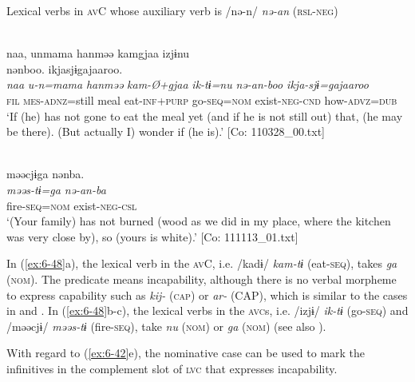   Lexical verbs in \textsc{av}C whose auxiliary verb is /nə-n/ \textit{nə-an} (\textsc{rsl}-\textsc{neg})

\ex{}\\
{\TM}
\glll  naa,  unmama  hanməə  kamgjaa  izjɨnu\\                                                                                        nənboo.  ikjasjɨgajaaroo.\\
      \textit{naa}  \textit{u-n=mama}  \textit{hanməə}  \textit{kam-Ø+gjaa}  \textit{ik-tɨ=nu}                                        \textit{nə-an-boo  ikja-sjɨ=gajaaroo}\\
      \textsc{fil}  \textsc{mes}-\textsc{adnz}=still  meal  eat-\textsc{inf}+\textsc{purp}  go-\textsc{seq}=\textsc{nom}              exist-\textsc{neg}-\textsc{cnd}  how-\textsc{advz}=\textsc{dub}\\
\glt ‘If (he) has not gone to eat the meal yet (and if he is not still out) that, (he may be there). (But actually I) wonder if (he is).’ [Co: 110328\_00.txt]

\ex{}\\
{\TM}
\glll  məəcjɨga  nənba.\\
\textit{məəs-tɨ=ga}  \textit{nə-an-ba}\\
fire-\textsc{seq}=\textsc{nom}  exist-\textsc{neg}-\textsc{csl}\\
\glt ‘(Your family) has not burned (wood as we did in my place, where the kitchen was very close by), so (yours is white).’ [Co: 111113\_01.txt]
\z
\z

In (\ref{ex:6-48}a), the lexical verb in the \textsc{av}C, i.e. /kadɨ/ \textit{kam-tɨ} (eat-\textsc{seq}), takes \textit{ga} (\textsc{nom}). The predicate means incapability, although there is no verbal morpheme to express capability such as \textit{kij-} (\textsc{cap}) or \textit{ar-} (CAP), which is similar to the cases in  and . In (\ref{ex:6-48}b-c), the lexical verbs in the \textsc{avc}s, i.e. /izjɨ/ \textit{ik-tɨ} (go-\textsc{seq}) and /məəcjɨ/ \textit{məəs-tɨ} (fire-\textsc{seq}), take \textit{nu} (\textsc{nom}) or \textit{ga} (\textsc{nom}) (see also ).

With regard to (\ref{ex:6-42}e), the nominative case can be used to mark the infinitives in the complement slot of \textsc{lvc} that expresses incapability.

